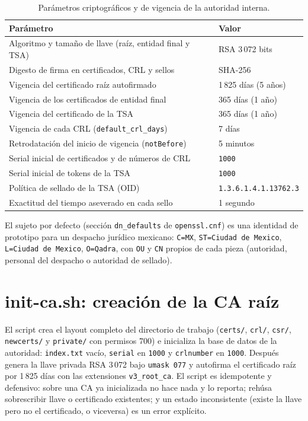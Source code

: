 \begin{table}[H]
  \centering
  \caption{Parámetros criptográficos y de vigencia de la autoridad interna.}
  \label{tab:pki-parametros}
  \begin{tabularx}{\linewidth}{@{}X l@{}}
    \toprule
    \textbf{Parámetro} & \textbf{Valor} \\
    \midrule
    Algoritmo y tamaño de llave (raíz, entidad final y TSA) & RSA 3\,072 bits \\
    Digesto de firma en certificados, CRL y sellos & SHA-256 \\
    Vigencia del certificado raíz autofirmado & 1\,825 días (5 años) \\
    Vigencia de los certificados de entidad final & 365 días (1 año) \\
    Vigencia del certificado de la TSA & 365 días (1 año) \\
    Vigencia de cada CRL (\texttt{default\_crl\_days}) & 7 días \\
    Retrodatación del inicio de vigencia (\texttt{notBefore}) & 5 minutos \\
    Serial inicial de certificados y de números de CRL & \texttt{1000} \\
    Serial inicial de tokens de la TSA & \texttt{1000} \\
    Política de sellado de la TSA (OID) & \texttt{1.3.6.1.4.1.13762.3} \\
    Exactitud del tiempo aseverado en cada sello & 1 segundo \\
    \bottomrule
  \end{tabularx}
\end{table}

El sujeto por defecto (sección \texttt{dn\_defaults} de \texttt{openssl.cnf}) es una identidad de prototipo para un despacho jurídico mexicano: \texttt{C=MX}, \texttt{ST=Ciudad de Mexico}, \texttt{L=Ciudad de Mexico}, \texttt{O=Qadra}, con \texttt{OU} y \texttt{CN} propios de cada pieza (autoridad, personal del despacho o autoridad de sellado).

\section{init-ca.sh: creación de la CA raíz}\label{sec:pki-init-ca}

El script crea el layout completo del directorio de trabajo (\texttt{certs/}, \texttt{crl/}, \texttt{csr/}, \texttt{newcerts/} y \texttt{private/} con permisos 700) e inicializa la base de datos de la autoridad: \texttt{index.txt} vacío, \texttt{serial} en \texttt{1000} y \texttt{crlnumber} en \texttt{1000}. Después genera la llave privada RSA 3\,072 bajo \texttt{umask 077} y autofirma el certificado raíz por 1\,825 días con las extensiones \texttt{v3\_root\_ca}. El script es idempotente y defensivo: sobre una CA ya inicializada no hace nada y lo reporta; rehúsa sobrescribir llave o certificado existentes; y un estado inconsistente (existe la llave pero no el certificado, o viceversa) es un error explícito.

